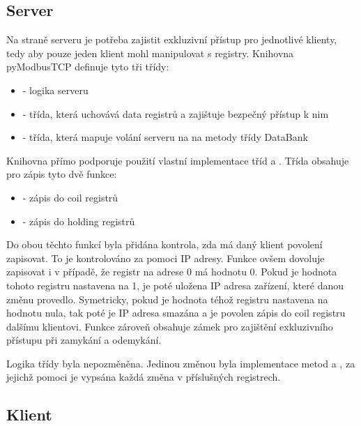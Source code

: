 \subsection{Server}

Na straně serveru je potřeba zajistit exkluzivní přístup pro jednotlivé klienty, tedy aby pouze jeden klient mohl manipulovat s registry. Knihovna pyModbusTCP definuje tyto tři třídy:

\begin{itemize}
    \item {} - logika serveru
    \item {} - třída, která uchovává data registrů a zajištuje bezpečný přístup k nim
    \item {} - třída, která mapuje volání serveru na na metody třídy DataBank
\end{itemize}

Knihovna přímo podporuje použití vlastní implementace tříd  a . Třída  obsahuje pro zápis tyto dvě funkce:

\begin{itemize}
    \item {} - zápis do coil registrů 
    \item {} - zápis do holding registrů
\end{itemize}

Do obou těchto funkcí byla přidána kontrola, zda má daný klient povolení zapisovat. To je kontrolováno za pomoci IP adresy. Funkce  ovšem dovoluje zapisovat i v případě, že registr na adrese 0 má hodnotu 0. Pokud je hodnota tohoto registru nastavena na 1, je poté uložena IP adresa zařízení, které danou změnu provedlo. Symetricky, pokud je hodnota téhož registru nastavena na hodnotu nula, tak poté je IP adresa smazána a je povolen zápis do coil registru dalšímu klientovi. Funkce zároveň obsahuje zámek pro zajištění exkluzivního přístupu při zamykání a odemykání. 

Logika třídy  byla nepozměněna. Jedinou změnou byla implementace metod  a , za jejichž pomoci je vypsána každá změna v příslušných registrech. 

\subsection{Klient}


